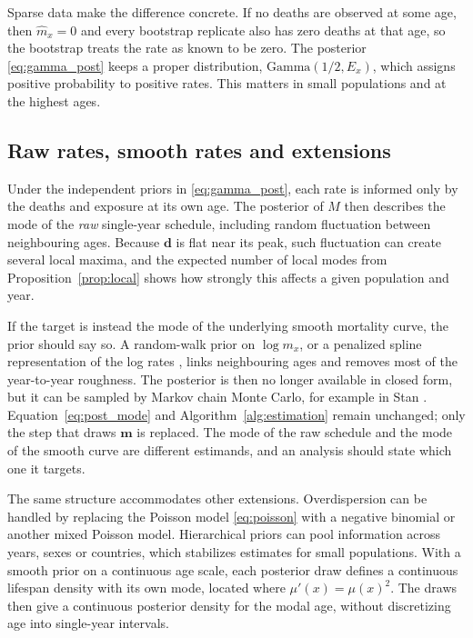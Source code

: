 \documentclass[12pt, letterpaper]{article}
\begin{document}
Sparse data make the difference concrete. If no deaths are observed at some age, then $\hat m_x = 0$ and every bootstrap replicate also has zero deaths at that age, so the bootstrap treats the rate as known to be zero. The posterior \eqref{eq:gamma_post} keeps a proper distribution, $\text{Gamma}(1/2, E_x)$, which assigns positive probability to positive rates. This matters in small populations and at the highest ages.

\subsection{Raw rates, smooth rates and extensions}
\label{sec:extensions}

Under the independent priors in \eqref{eq:gamma_post}, each rate is informed only by the deaths and exposure at its own age. The posterior of $M$ then describes the mode of the \emph{raw} single-year schedule, including random fluctuation between neighbouring ages. Because $\bm{d}$ is flat near its peak, such fluctuation can create several local maxima, and the expected number of local modes from Proposition~\ref{prop:local} shows how strongly this affects a given population and year.

If the target is instead the mode of the underlying smooth mortality curve, the prior should say so. A random-walk prior on $\log m_x$, or a penalized spline representation of the log rates \citep{delwarde2007smoothing, ouellette2011changes}, links neighbouring ages and removes most of the year-to-year roughness. The posterior is then no longer available in closed form, but it can be sampled by Markov chain Monte Carlo, for example in Stan \citep{carpenter2017stan}. Equation~\eqref{eq:post_mode} and Algorithm~\ref{alg:estimation} remain unchanged; only the step that draws $\bm{m}$ is replaced. The mode of the raw schedule and the mode of the smooth curve are different estimands, and an analysis should state which one it targets.

The same structure accommodates other extensions. Overdispersion can be handled by replacing the Poisson model \eqref{eq:poisson} with a negative binomial or another mixed Poisson model. Hierarchical priors can pool information across years, sexes or countries, which stabilizes estimates for small populations. With a smooth prior on a continuous age scale, each posterior draw defines a continuous lifespan density with its own mode, located where $\mu'(x) = \mu(x)^2$. The draws then give a continuous posterior density for the modal age, without discretizing age into single-year intervals.
\end{document}
